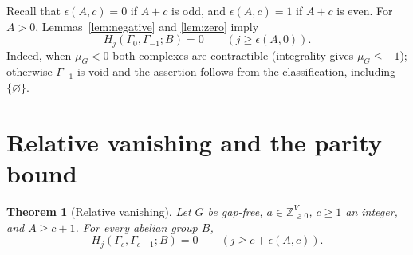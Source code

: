 \documentclass[11pt,a4paper]{article}
\newtheorem{theorem}{Theorem}
\theoremstyle{definition}
\newcommand{\NN}{\mathbb Z_{\geq 0}}
\newcommand{\G}{\Gamma}
\begin{document}
Recall that $\epsilon(A,c)=0$ if $A+c$ is odd, and $\epsilon(A,c)=1$ if $A+c$ is even. For $A>0$, Lemmas~\ref{lem:negative} and \ref{lem:zero} imply
\begin{equation}\label{eq:relativezero}
 H_j(\G_0,\G_{-1};B)=0\qquad(j\geq\epsilon(A,0)).
\end{equation}
Indeed, when $\mu_G<0$ both complexes are contractible (integrality gives $\mu_G\leq-1$); otherwise $\G_{-1}$ is void and the assertion follows from the classification, including $\{\varnothing\}$.

\section{Relative vanishing and the parity bound}\label{sec:relative}
\begin{theorem}[Relative vanishing]\label{thm:relative}
Let $G$ be gap-free, $a\in\NN^V$, $c\geq1$ an integer, and $A\geq c+1$. For every abelian group $B$,
\begin{equation}\label{eq:relative}
 H_j(\G_c,\G_{c-1};B)=0\qquad(j\geq c+\epsilon(A,c)).
\end{equation}
\end{theorem}
\end{document}
